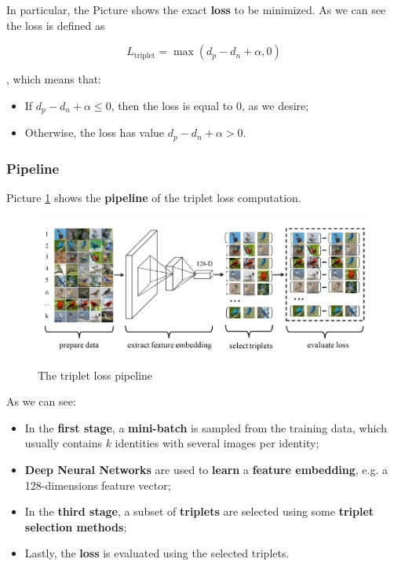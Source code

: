 In particular, the Picture shows the exact \textbf{loss} to be minimized. As we can see the loss is defined as 

$$
L_{\text{triplet}} = \max(d_p - d_n + \alpha, 0)
$$

, which means that:

\begin{itemize}
    \item If $d_p - d_n + \alpha \leq 0$, then the loss is equal to 0, as we desire;
    \item Otherwise, the loss has value $d_p - d_n + \alpha > 0$.
\end{itemize}

\subsubsection{Pipeline}
Picture \ref{camc14} shows the \textbf{pipeline} of the triplet loss computation.

\begin{figure}[h!]
    \centering
    \includegraphics[scale = 1.4]{img/camc14.jpg}
    \label{camc14}
    \caption{The triplet loss pipeline}
\end{figure}

As we can see:

\begin{itemize}
    \item In the \textbf{first stage}, a \textbf{mini-batch} is sampled from the training data, which usually contains $k$ identities with several images per identity;
    \item \textbf{Deep Neural Networks} are used to \textbf{learn} a \textbf{feature embedding}, e.g. a 128-dimensions feature vector;
    \item In the \textbf{third stage}, a subset of \textbf{triplets} are selected using some \textbf{triplet selection methods};
    \item Lastly, the \textbf{loss} is evaluated using the selected triplets.
\end{itemize}

